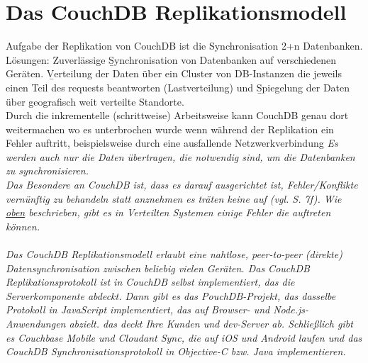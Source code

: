 \section{Das CouchDB Replikationsmodell}
Aufgabe der Replikation von CouchDB ist die Synchronisation 2+n Datenbanken. Lösungen: Zuverlässige \b{Synchronisation} von Datenbanken auf verschiedenen Geräten. \b{Verteilung} der Daten über ein Cluster von DB-Instanzen die jeweils einen Teil des requests beantworten (Lastverteilung) und \b{Spiegelung} der Daten über geografisch weit verteilte Standorte.\\
Durch die inkrementelle (schrittweise) Arbeitsweise kann CouchDB genau dort weitermachen wo es unterbrochen wurde wenn während der Replikation ein Fehler auftritt, beispielsweise durch eine ausfallende Netzwerkverbindung
\it{Es werden auch nur die Daten übertragen, die notwendig sind, um die Datenbanken zu synchronisieren.}\\
Das Besondere an CouchDB ist, dass es darauf ausgerichtet ist, Fehler/Konflikte vernünftig zu behandeln statt anznehmen es träten keine auf (vgl. \cite{couchDB} S. 7f). Wie \hyperref[sec:conflict]{oben} beschrieben, gibt es in Verteilten Systemen einige Fehler die auftreten können.\\\\
\it{Das CouchDB Replikationsmodell erlaubt eine nahtlose, peer-to-peer (direkte) Datensynchronisation zwischen beliebig vielen Geräten. Das CouchDB Replikationsprotokoll ist in CouchDB selbst implementiert, das die Serverkomponente abdeckt. Dann gibt es das PouchDB-Projekt, das dasselbe Protokoll in JavaScript implementiert, das auf Browser- und Node.js-Anwendungen abzielt. das deckt Ihre Kunden und dev-Server ab. Schließlich gibt es Couchbase Mobile und Cloudant Sync, die auf iOS und Android laufen und das CouchDB Synchronisationsprotokoll in Objective-C bzw. Java implementieren.}

